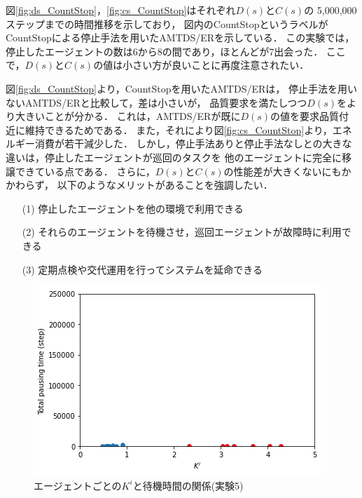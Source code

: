 \documentclass[12pt,a4j,twoside]{jarticle}
\begin{document}
  図\ref{fig:ds_CountStop}，\ref{fig:cs_CountStop}はそれぞれ$D(s)$と$C(s)$の
  5,000,000ステップまでの時間推移を示しており，
  図内のCountStopというラベルがCountStopによる停止手法を用いたAMTDS/ERを示している．
  この実験では，停止したエージェントの数は6から8の間であり，ほとんどが7出会った．
  ここで，$D(s)$と$C(s)$の値は小さい方が良いことに再度注意されたい．
  \par

  図\ref{fig:ds_CountStop}より，CountStopを用いたAMTDS/ERは，
  停止手法を用いないAMTDS/ERと比較して，差は小さいが，
  品質要求を満たしつつ$D(s)$をより大きいことが分かる．
  これは，AMTDS/ERが既に$D(s)$の値を要求品質付近に維持できるためである．
  また，それにより図\ref{fig:cs_CountStop}より，エネルギー消費が若干減少した．
  しかし，停止手法ありと停止手法なしとの大きな違いは，停止したエージェントが巡回のタスクを
  他のエージェントに完全に移譲できている点である．
  さらに，$D(s)$と$C(s)$の性能差が大きくないにもかかわらず，
  以下のようなメリットがあることを強調したい．
  \begin{enumerate}
    \item[(1)] 停止したエージェントを他の環境で利用できる
    \item[(2)] それらのエージェントを待機させ，巡回エージェントが故障時に利用できる
    \item[(3)] 定期点検や交代運用を行ってシステムを延命できる
  \end{enumerate}


  \begin{figure}
    \centering
    \includegraphics[width=0.8\hsize]{figures/CorrectionScatter_Office_CountStop.png}
    \caption{エージェントごとの$K^i$と待機時間の関係(実験5)}
    \label{fig:cscatter_CountStop_Office}
  \end{figure}
\end{document}
